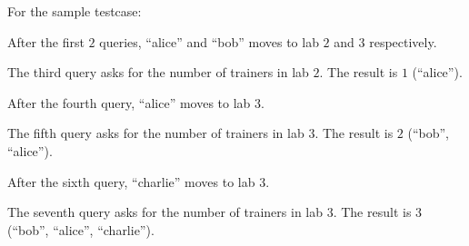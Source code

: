For the sample testcase:

After the first $2$ queries, ``alice'' and ``bob'' moves to lab $2$ and $3$ respectively.

The third query asks for the number of trainers in lab $2$. The result is $1$ (``alice'').

After the fourth query, ``alice'' moves to lab $3$.

The fifth query asks for the number of trainers in lab $3$. The result is $2$ (``bob'', ``alice'').

After the sixth query, ``charlie'' moves to lab 3.

The seventh query asks for the number of trainers in lab 3. The result is $3$ (``bob'', ``alice'', ``charlie'').